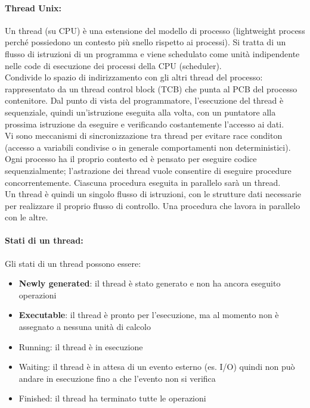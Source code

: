 \paragraph{Thread Unix:} Un thread (su CPU) è una estensione del modello di processo (lightweight process perché possiedono un contesto più snello rispetto ai processi). Si tratta di un flusso di istruzioni di un programma e viene schedulato come unità indipendente nelle code di esecuzione dei processi della CPU (scheduler).\\
Condivide lo spazio di indirizzamento con gli altri thread del processo: rappresentato da un thread control block (TCB) che punta al PCB del processo contenitore. Dal punto di vista del programmatore, l’esecuzione del thread è sequenziale, quindi un'istruzione eseguita alla volta, con un puntatore alla prossima istruzione da eseguire e verificando costantemente l’accesso ai dati.\\
Vi sono meccanismi di sincronizzazione tra thread per evitare race conditon (accesso a variabili condivise o in generale comportamenti non deterministici).\\

Ogni processo ha il proprio contesto ed è pensato per eseguire codice sequenzialmente; l'astrazione dei thread vuole consentire di eseguire procedure concorrentemente. Ciascuna procedura eseguita in parallelo sarà un thread.\\
Un thread è quindi un singolo flusso di istruzioni, con le strutture dati necessarie per realizzare il proprio flusso di controllo. Una procedura che lavora in parallelo con le altre.\\

\paragraph{Stati di un thread:} Gli stati di un thread possono essere:
\begin{itemize}
	\item \textbf{Newly generated}: il thread è stato generato e non ha ancora eseguito operazioni
	\item \textbf{Executable}: il thread è pronto per l'esecuzione, ma al momento non è assegnato a nessuna unità di calcolo
	\item Running: il thread è in esecuzione
	\item Waiting: il thread è in attesa di un evento esterno (es. I/O) quindi non può andare in esecuzione fino a che l'evento non si verifica
	\item Finished: il thread ha terminato tutte le operazioni
\end{itemize}

